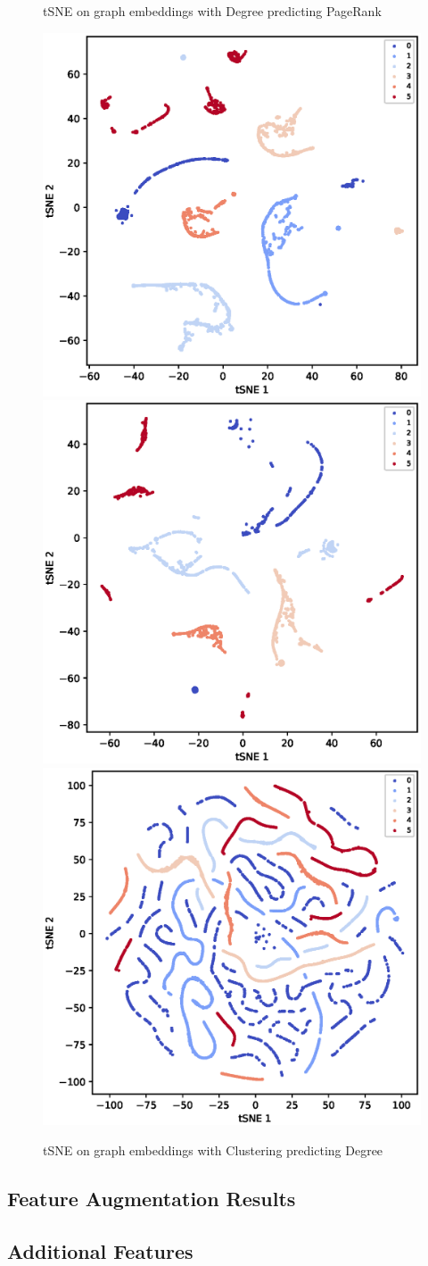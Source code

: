 \documentclass[sigconf]{acmart}
\begin{document}
\begin{figure}[h]
\begin{center}
    \caption{tSNE on graph embeddings with Degree predicting PageRank}
  \hspace*{-1.5in}
    \includegraphics[width=0.35\linewidth]{fig/Cora_2to1_tSNE.eps}
    \includegraphics[width=0.35\linewidth]{fig/Citeseer_2to1_tSNE.eps}
    \includegraphics[width=0.35\linewidth]{fig/PubMed_2to1_tSNE.eps}
    \hspace*{-1.5in}

    \caption{tSNE on graph embeddings with Clustering predicting Degree}
\end{center}
\end{figure}











\subsection{Feature Augmentation Results}

\subsection{Additional Features}
\end{document}
